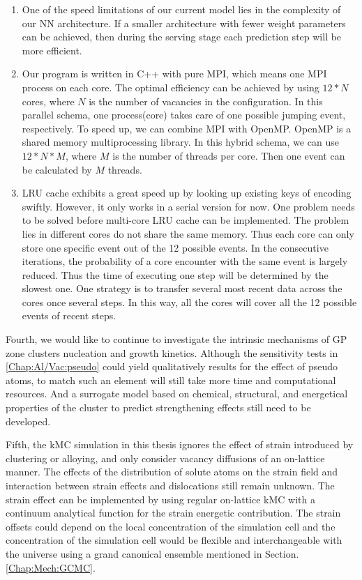 \begin{enumerate}

  \item One of the speed limitations of our current model lies in the complexity of our \ac{NN} architecture. If a smaller architecture with fewer weight parameters can be achieved, then during the serving stage each prediction step will be more efficient.

  \item Our program is written in C++ with pure \ac{MPI}, which means one \ac{MPI} process on each core. The optimal efficiency can be achieved by using $12*N$ cores, where $N$ is the number of vacancies in the configuration. In this parallel schema, one process(core) takes care of one possible jumping event, respectively. To speed up, we can combine \ac{MPI} with OpenMP. OpenMP is a shared memory multiprocessing library. In this hybrid schema, we can use $12*N*M$, where $M$ is the number of threads per core. Then one event can be calculated by $M$ threads.

  \item \ac{LRU} cache exhibits a great speed up by looking up existing keys of encoding swiftly. However, it only works in a serial version for now. One problem needs to be solved before multi-core \ac{LRU} cache can be implemented. The problem lies in different cores do not share the same memory. Thus each core can only store one specific event out of the 12 possible events. In the consecutive iterations, the probability of a core encounter with the same event is largely reduced. Thus the time of executing one step will be determined by the slowest one. One strategy is to transfer several most recent data across the cores once several steps. In this way, all the cores will cover all the 12 possible events of recent steps.

\end{enumerate}

Fourth, we would like to continue to investigate the intrinsic mechanisms of GP zone clusters nucleation and growth kinetics. Although the sensitivity tests in \ref{Chap:Al/Vac:pseudo} could yield qualitatively results for the effect of pseudo atoms, to match such an element will still take more time and computational resources. And a surrogate model based on chemical, structural, and energetical properties of the cluster to predict strengthening effects still need to be developed.

Fifth, the \ac{kMC} simulation in this thesis ignores the effect of strain introduced by clustering or alloying, and only consider vacancy diffusions of an on-lattice manner. The effects of the distribution of solute atoms on the strain field and interaction between strain effects and dislocations still remain unknown. The strain effect can be implemented by using regular on-lattice \ac{kMC} with a continuum analytical function for the strain energetic contribution. The strain offsets could depend on the local concentration of the simulation cell and the concentration of the simulation cell would be flexible and interchangeable with the universe using a grand canonical ensemble mentioned in Section. \ref{Chap:Mech:GCMC}.

